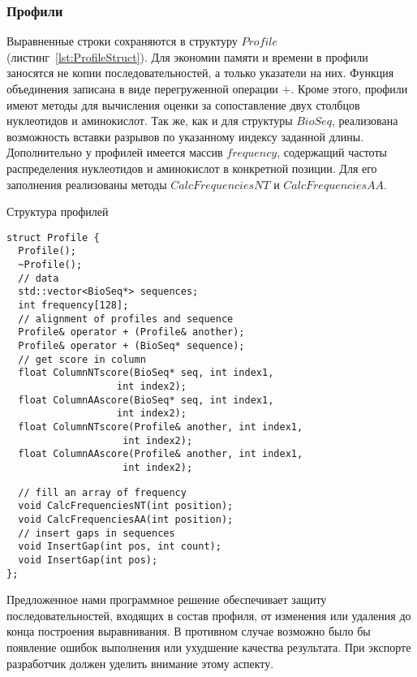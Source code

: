 \subsubsection[Профили]{\large Профили}
\hspace{\parindent} Выравненные строки сохраняются в структуру $Profile$ (листинг~\ref{lst:ProfileStruct}). Для экономии памяти и времени в профили заносятся не копии последовательностей, а только указатели на них. Функция объединения записана в виде перегруженной операции $+$. Кроме этого, профили имеют методы для вычисления оценки за сопоставление двух столбцов нуклеотидов и аминокислот. Так же, как и для структуры $BioSeq$, реализована возможность вставки разрывов по указанному индексу заданной длины. Дополнительно у профилей имеется массив $frequency$, содержащий частоты распределения нуклеотидов и аминокислот в конкретной позиции. Для его заполнения реализованы методы $CalcFrequenciesNT$ и $CalcFrequenciesAA$.\\
\begin{algorithm}
	\caption{Структура профилей} \label{lst:ProfileStruct}
	\begin{lstlisting}
struct Profile {
  Profile();
  ~Profile();
  // data
  std::vector<BioSeq*> sequences;
  int frequency[128];
  // alignment of profiles and sequence
  Profile& operator + (Profile& another);
  Profile& operator + (BioSeq* sequence);
  // get score in column
  float ColumnNTscore(BioSeq* seq, int index1, 
  				   int index2);
  float ColumnAAscore(BioSeq* seq, int index1, 
  				   int index2);
  float ColumnNTscore(Profile& another, int index1, 
  					int index2);
  float ColumnAAscore(Profile& another, int index1, 
   					int index2);
  	\end{lstlisting}
\end{algorithm}

\begin{algorithm}
	\begin{lstlisting}
  // fill an array of frequency
  void CalcFrequenciesNT(int position);
  void CalcFrequenciesAA(int position);
  // insert gaps in sequences
  void InsertGap(int pos, int count);
  void InsertGap(int pos);  
};
	\end{lstlisting}
	
\end{algorithm}

\indent Предложенное нами программное решение обеспечивает защиту последовательностей, входящих в состав профиля, от изменения или удаления до конца построения выравнивания. В противном случае возможно было бы появление ошибок выполнения или ухудшение качества результата. При экспорте разработчик должен уделить внимание этому аспекту.

